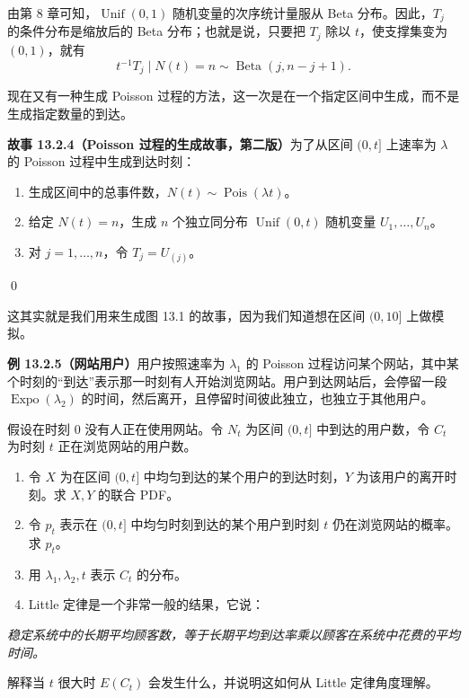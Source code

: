 \documentclass[UTF8,12pt,a4paper,fontset=fandol]{ctexart}
\begin{document}
由第 8 章可知，$\operatorname{Unif}(0,1)$ 随机变量的次序统计量服从 Beta 分布。因此，$T_j$ 的条件分布是缩放后的 Beta 分布；也就是说，只要把 $T_j$ 除以 $t$，使支撑集变为 $(0,1)$，就有
\[
  t^{-1}T_j\mid N(t)=n \sim \operatorname{Beta}(j,n-j+1).
\]

现在又有一种生成 Poisson 过程的方法，这一次是在一个指定区间中生成，而不是生成指定数量的到达。

\noindent\textbf{故事 13.2.4（Poisson 过程的生成故事，第二版）}\quad 为了从区间 $(0,t]$ 上速率为 $\lambda$ 的 Poisson 过程中生成到达时刻：
\begin{enumerate}
  \item 生成区间中的总事件数，$N(t)\sim\operatorname{Pois}(\lambda t)$。
  \item 给定 $N(t)=n$，生成 $n$ 个独立同分布 $\operatorname{Unif}(0,t)$ 随机变量 $U_1,\ldots,U_n$。
  \item 对 $j=1,\ldots,n$，令 $T_j=U_{(j)}$。
\end{enumerate}
\qed

这其实就是我们用来生成图 13.1 的故事，因为我们知道想在区间 $(0,10]$ 上做模拟。

\noindent\textbf{例 13.2.5（网站用户）}\quad 用户按照速率为 $\lambda_1$ 的 Poisson 过程访问某个网站，其中某个时刻的“到达”表示那一时刻有人开始浏览网站。用户到达网站后，会停留一段 $\operatorname{Expo}(\lambda_2)$ 的时间，然后离开，且停留时间彼此独立，也独立于其他用户。

假设在时刻 $0$ 没有人正在使用网站。令 $N_t$ 为区间 $(0,t]$ 中到达的用户数，令 $C_t$ 为时刻 $t$ 正在浏览网站的用户数。

\begin{enumerate}
  \item 令 $X$ 为在区间 $(0,t]$ 中均匀到达的某个用户的到达时刻，$Y$ 为该用户的离开时刻。求 $X,Y$ 的联合 PDF。
  \item 令 $p_t$ 表示在 $(0,t]$ 中均匀时刻到达的某个用户到时刻 $t$ 仍在浏览网站的概率。求 $p_t$。
  \item 用 $\lambda_1,\lambda_2,t$ 表示 $C_t$ 的分布。
  \item Little 定律是一个非常一般的结果，它说：
\end{enumerate}

\noindent\textit{稳定系统中的长期平均顾客数，等于长期平均到达率乘以顾客在系统中花费的平均时间。}

解释当 $t$ 很大时 $E(C_t)$ 会发生什么，并说明这如何从 Little 定律角度理解。
\end{document}
